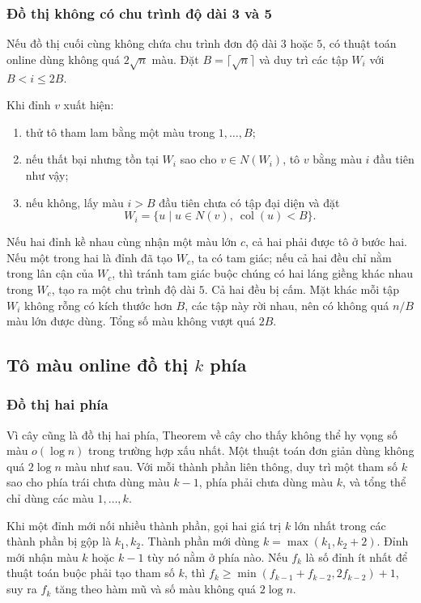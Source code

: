 \documentclass[11pt]{article}
\begin{document}
\subsubsection{Đồ thị không có chu trình độ dài 3 và 5}

Nếu đồ thị cuối cùng không chứa chu trình đơn độ dài $3$ hoặc $5$, có thuật
toán online dùng không quá $2\sqrt n$ màu. Đặt $B=\lceil\sqrt n\rceil$ và duy
trì các tập $W_i$ với $B<i\le 2B$.

Khi đỉnh $v$ xuất hiện:
\begin{enumerate}
  \item thử tô tham lam bằng một màu trong $1,\ldots,B$;
  \item nếu thất bại nhưng tồn tại $W_i$ sao cho $v\in N(W_i)$, tô $v$ bằng
  màu $i$ đầu tiên như vậy;
  \item nếu không, lấy màu $i>B$ đầu tiên chưa có tập đại diện và đặt
  \[
    W_i=\{u\mid u\in N(v),\ \operatorname{col}(u)<B\}.
  \]
\end{enumerate}

Nếu hai đỉnh kề nhau cùng nhận một màu lớn $c$, cả hai phải được tô ở bước hai.
Nếu một trong hai là đỉnh đã tạo $W_c$, ta có tam giác; nếu cả hai đều chỉ nằm
trong lân cận của $W_c$, thì tránh tam giác buộc chúng có hai láng giềng khác
nhau trong $W_c$, tạo ra một chu trình độ dài $5$. Cả hai đều bị cấm. Mặt khác
mỗi tập $W_i$ không rỗng có kích thước hơn $B$, các tập này rời nhau, nên có
không quá $n/B$ màu lớn được dùng. Tổng số màu không vượt quá $2B$.

\subsection{\texorpdfstring{Tô màu online đồ thị $k$ phía}{Tô màu online đồ thị k phía}}

\subsubsection{Đồ thị hai phía}

Vì cây cũng là đồ thị hai phía, Theorem về cây cho thấy không thể hy vọng số
màu $o(\log n)$ trong trường hợp xấu nhất. Một thuật toán đơn giản dùng không
quá $2\log n$ màu như sau. Với mỗi thành phần liên thông, duy trì một tham số
$k$ sao cho phía trái chưa dùng màu $k-1$, phía phải chưa dùng màu $k$, và tổng
thể chỉ dùng các màu $1,\ldots,k$.

Khi một đỉnh mới nối nhiều thành phần, gọi hai giá trị $k$ lớn nhất trong các
thành phần bị gộp là $k_1,k_2$. Thành phần mới dùng
$k=\max(k_1,k_2+2)$. Đỉnh mới nhận màu $k$ hoặc $k-1$ tùy nó nằm ở phía nào.
Nếu $f_k$ là số đỉnh ít nhất để thuật toán buộc phải tạo tham số $k$, thì
$f_k\ge \min(f_{k-1}+f_{k-2},2f_{k-2})+1$, suy ra $f_k$ tăng theo hàm mũ và số
màu không quá $2\log n$.
\end{document}
